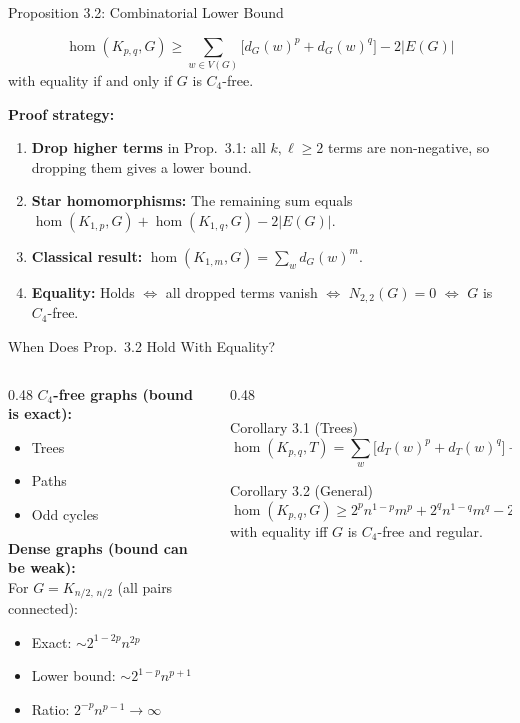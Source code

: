 \documentclass[aspectratio=169]{beamer}
\begin{document}
\begin{frame}{Proposition 3.2: Combinatorial Lower Bound}
  \begin{theorem}[Proposition 3.2]
    \[
      \hom(K_{p,q}, G) \geq \sum_{w \in V(G)} \bigl[d_G(w)^p + d_G(w)^q\bigr] - 2|E(G)|
    \]
    with equality if and only if $G$ is $C_4$-free.
  \end{theorem}

  \textbf{Proof strategy:}
  \begin{enumerate}
    \item \textbf{Drop higher terms} in Prop.\ 3.1: all $k, \ell \geq 2$ terms are non-negative, so dropping them gives a lower bound.
    \item \textbf{Star homomorphisms:} The remaining sum equals
      $\hom(K_{1,p}, G) + \hom(K_{1,q}, G) - 2|E(G)|$.
    \item \textbf{Classical result:} $\hom(K_{1,m}, G) = \sum_w d_G(w)^m$.
    \item \textbf{Equality:} Holds $\Leftrightarrow$ all dropped terms vanish $\Leftrightarrow$ $N_{2,2}(G) = 0$ $\Leftrightarrow$ $G$ is $C_4$-free.
  \end{enumerate}
\end{frame}

\begin{frame}{When Does Prop.\ 3.2 Hold With Equality?}
  \begin{columns}
    \begin{column}{0.48\textwidth}
      \textbf{$C_4$-free graphs (bound is exact):}
      \begin{itemize}
        \item Trees
        \item Paths
        \item Odd cycles
      \end{itemize}

      \textbf{Dense graphs (bound can be weak):}\\
      For $G = K_{n/2,\,n/2}$ (all pairs connected):
      \begin{itemize}
        \item Exact: $\sim 2^{1-2p} n^{2p}$
        \item Lower bound: $\sim 2^{1-p} n^{p+1}$
        \item Ratio: $2^{-p} n^{p-1} \to \infty$
      \end{itemize}
    \end{column}
    \begin{column}{0.48\textwidth}
      \begin{block}{Corollary 3.1 (Trees)}
        \[
          \hom(K_{p,q},T) = \sum_w \bigl[d_T(w)^p + d_T(w)^q\bigr] - 2(n-1)
        \]
      \end{block}

      \begin{block}{Corollary 3.2 (General)}
        \[
          \hom(K_{p,q}, G) \geq 2^p n^{1-p} m^p + 2^q n^{1-q} m^q - 2m
        \]
        with equality iff $G$ is $C_4$-free and regular.
      \end{block}
    \end{column}
  \end{columns}
\end{frame}
\end{document}
